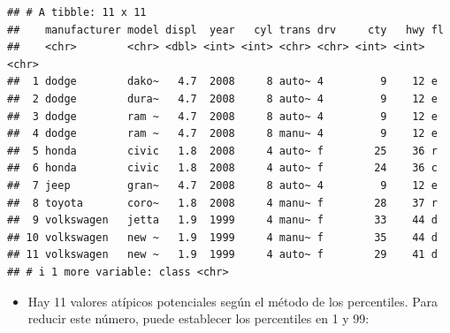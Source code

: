 \documentclass[
]{book}
\newenvironment{Shaded}{\begin{snugshade}}{\end{snugshade}}
\newcommand{\AttributeTok}[1]{\textcolor[rgb]{0.13,0.29,0.53}{#1}}
\newcommand{\ConstantTok}[1]{\textcolor[rgb]{0.56,0.35,0.01}{#1}}
\newcommand{\FloatTok}[1]{\textcolor[rgb]{0.00,0.00,0.81}{#1}}
\newcommand{\FunctionTok}[1]{\textcolor[rgb]{0.13,0.29,0.53}{\textbf{#1}}}
\newcommand{\NormalTok}[1]{#1}
\newcommand{\OtherTok}[1]{\textcolor[rgb]{0.56,0.35,0.01}{#1}}
\newcommand{\SpecialCharTok}[1]{\textcolor[rgb]{0.81,0.36,0.00}{\textbf{#1}}}
\providecommand{\tightlist}{%
  \setlength{\itemsep}{0pt}\setlength{\parskip}{0pt}}
\begin{document}
\begin{verbatim}
## # A tibble: 11 x 11
##    manufacturer model displ  year   cyl trans drv     cty   hwy fl   
##    <chr>        <chr> <dbl> <int> <int> <chr> <chr> <int> <int> <chr>
##  1 dodge        dako~   4.7  2008     8 auto~ 4         9    12 e    
##  2 dodge        dura~   4.7  2008     8 auto~ 4         9    12 e    
##  3 dodge        ram ~   4.7  2008     8 auto~ 4         9    12 e    
##  4 dodge        ram ~   4.7  2008     8 manu~ 4         9    12 e    
##  5 honda        civic   1.8  2008     4 auto~ f        25    36 r    
##  6 honda        civic   1.8  2008     4 auto~ f        24    36 c    
##  7 jeep         gran~   4.7  2008     8 auto~ 4         9    12 e    
##  8 toyota       coro~   1.8  2008     4 manu~ f        28    37 r    
##  9 volkswagen   jetta   1.9  1999     4 manu~ f        33    44 d    
## 10 volkswagen   new ~   1.9  1999     4 manu~ f        35    44 d    
## 11 volkswagen   new ~   1.9  1999     4 auto~ f        29    41 d    
## # i 1 more variable: class <chr>
\end{verbatim}

\begin{itemize}
\tightlist
\item
  Hay 11 valores atípicos potenciales según el método de los percentiles. Para reducir este número, puede establecer los percentiles en 1 y 99:
\end{itemize}

\begin{Shaded}
\end{Shaded}
\end{document}
